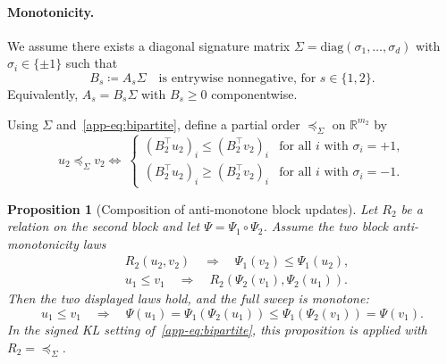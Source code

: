 \documentclass{article}
\theoremstyle{plain}
\newtheorem{proposition}{Proposition}[section]
\newcommand{\eqdef}{\coloneqq}
\newcommand{\RR}{\mathbb{R}}
\begin{document}
\paragraph{Monotonicity.}

We assume there exists a diagonal signature matrix $\Sigma=\mathrm{diag}(\sigma_1,\ldots,\sigma_d)$ with
$\sigma_i\in\{\pm1\}$ such that
\begin{equation}\label{app-eq:bipartite}
  B_s \eqdef A_s \Sigma \quad\text{is entrywise nonnegative, for } s\in\{1,2\}.
\end{equation}
Equivalently, $A_s = B_s \Sigma$ with $B_s\ge 0$ componentwise.

Using $\Sigma$ and~\eqref{app-eq:bipartite}, define a partial order $\preceq_\Sigma$ on $\RR^{m_2}$ by
\begin{equation}\label{app-eq:signed-order}
  u_2 \preceq_\Sigma v_2
  \Longleftrightarrow\
  \begin{cases}
    (B_2^\top u_2)_i \le (B_2^\top v_2)_i & \text{for all } i\text{ with } \sigma_i=+1,\\
    (B_2^\top u_2)_i \ge (B_2^\top v_2)_i & \text{for all } i\text{ with } \sigma_i=-1.
  \end{cases}
\end{equation}

\begin{proposition}[Composition of anti-monotone block updates]\label{app-prop:block-monotone}
Let $R_2$ be a relation on the second block and let $\Psi=\Psi_1\circ\Psi_2$.
Assume the two block anti-monotonicity laws
\begin{align}
&R_2(u_2,v_2)\quad\Longrightarrow\quad \Psi_1(v_2)\le\Psi_1(u_2),
\label{app-eq:block-antitone-1}\\
&u_1\le v_1\quad\Longrightarrow\quad R_2(\Psi_2(v_1),\Psi_2(u_1)).
\label{app-eq:block-antitone-2}
\end{align}
Then the two displayed laws hold, and the full sweep is monotone:
\[
  u_1\le v_1\quad\Longrightarrow\quad
  \Psi(u_1)=\Psi_1(\Psi_2(u_1))
  \le \Psi_1(\Psi_2(v_1))=\Psi(v_1).
\]
In the signed KL setting of~\eqref{app-eq:bipartite}, this proposition is applied with
$R_2=\preceq_\Sigma$.
\end{proposition}
\end{document}
